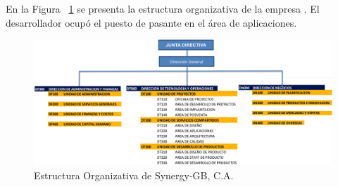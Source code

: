 En la Figura ~\ref{fig:estsyn} se presenta la estructura organizativa de la empresa \cite{ESGB1}. El desarrollador ocupó el puesto de pasante en el área de aplicaciones.

\begin{figure}[ht]
  \centering
  \includegraphics[scale=0.6,type=png,ext=.png,read=.png,angle=0,origin=c]{imagenes/estructurasynergy}
  \caption{Estructura Organizativa de Synergy-GB, C.A.}
  \label{fig:estsyn}
\end{figure}


